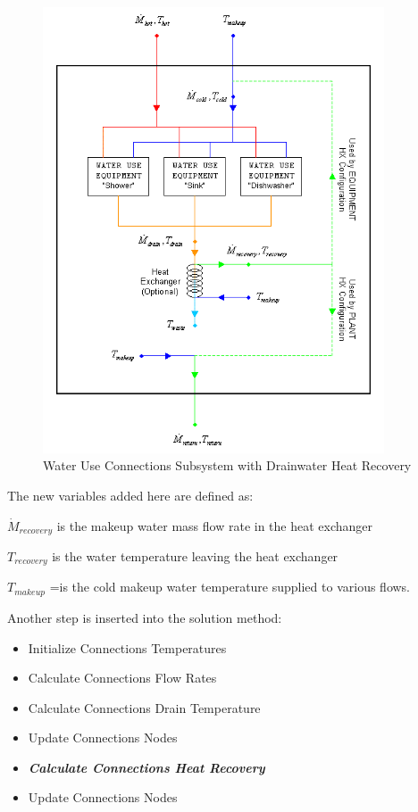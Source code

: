 \begin{figure}[hbtp] %
\centering
\includegraphics[width=0.9\textwidth, height=0.9\textheight, keepaspectratio=true]{media/image7054.png}
\caption{Water Use Connections Subsystem with Drainwater Heat Recovery \protect \label{fig:water-use-connections-subsystem-with}}
\end{figure}

The new variables added here are defined as:

\({\dot M_{recovery}}\) is the makeup water mass flow rate in the heat exchanger

\({T_{recovery}}\) is the water temperature leaving the heat exchanger

\({T_{makeup}}\) =is the cold makeup water temperature supplied to various flows.

Another step is inserted into the solution method:

\begin{itemize}
\item Initialize Connections Temperatures
\item Calculate Connections Flow Rates
\item Calculate Connections Drain Temperature
\item Update Connections Nodes
\item \textbf{\emph{Calculate Connections Heat Recovery}}
\item Update Connections Nodes
\end{itemize}

